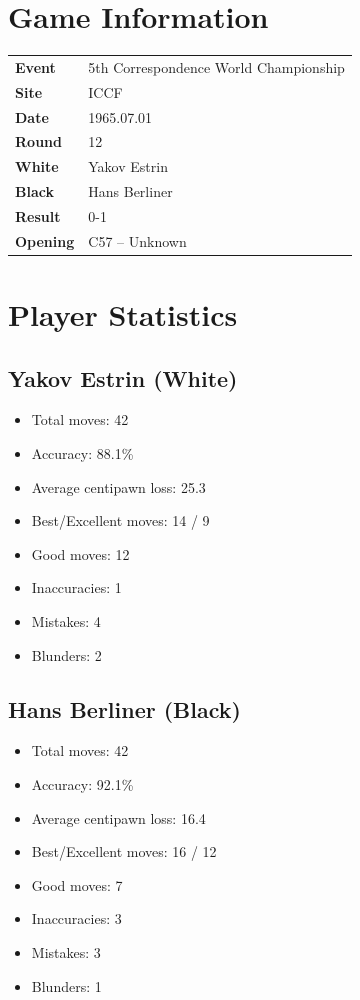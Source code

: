 \documentclass[11pt]{book}
\begin{document}
\section{Game Information}
\begin{tabular}{ll}
\textbf{Event} & 5th Correspondence World Championship \\
\textbf{Site} & ICCF \\
\textbf{Date} & 1965.07.01 \\
\textbf{Round} & 12 \\
\textbf{White} & Yakov Estrin \\
\textbf{Black} & Hans Berliner \\
\textbf{Result} & 0-1 \\
\textbf{Opening} & C57 -- Unknown \\
\end{tabular}

\section{Player Statistics}

\subsection{Yakov Estrin (White)}
\begin{itemize}
\item Total moves: 42
\item Accuracy: 88.1\%
\item Average centipawn loss: 25.3
\item Best/Excellent moves: 14 / 9
\item Good moves: 12
\item Inaccuracies: 1
\item Mistakes: 4
\item Blunders: 2
\end{itemize}

\subsection{Hans Berliner (Black)}
\begin{itemize}
\item Total moves: 42
\item Accuracy: 92.1\%
\item Average centipawn loss: 16.4
\item Best/Excellent moves: 16 / 12
\item Good moves: 7
\item Inaccuracies: 3
\item Mistakes: 3
\item Blunders: 1
\end{itemize}
\end{document}
